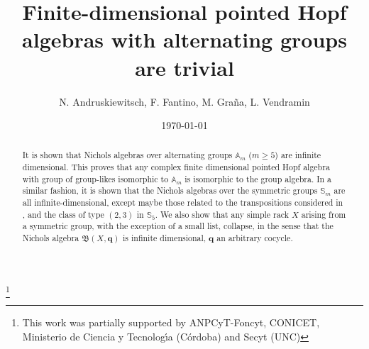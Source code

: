 \documentclass[11pt]{amsart} \textheight 22cm
\renewcommand{\^}[1]{\mbox{$^{\left( #1 \right)}$}}
\renewcommand{\_}[1]{\mbox{$_{\left( #1 \right)}$}}
\newcommand\toba{{\mathfrak B }}
\newcommand{\q}{{\mathbf q}}
\theoremstyle{plain}
\theoremstyle{definition}
\theoremstyle{remark}
\newcommand\sco{\mathbb S_5}
\newcommand\am{\mathbb A_m}
\newcommand\sm{\mathbb S_m}
\theoremstyle{remark}
\begin{document}
\renewcommand{\baselinestretch}{1.2}

\thispagestyle{empty}

\title[pointed Hopf algebras over $\am$ and $\sm$]
{Finite-dimensional pointed Hopf algebras with alternating groups
are trivial}

\author[Andruskiewitsch, Fantino, Gra\~na, Vendramin]{N. Andruskiewitsch,
F. Fantino, M. Gra\~na, L. Vendramin}

\thanks{This work was partially supported by ANPCyT-Foncyt, CONICET, Ministerio de Ciencia y
Tecnolog\'{\i}a (C\'ordoba)  and Secyt (UNC)}

\address{\noindent N. A., F. F. : Facultad de Matem\'atica, Astronom\'{\i}a y F\'{\i}sica,
Universidad Nacional de C\'ordoba. CIEM -- CONICET. %
Medina Allende s/n (5000) Ciudad Universitaria, C\'ordoba,
Argentina}
\address{\noindent M. G., L. V. : Departamento de Matem\'atica -- FCEyN,
Universidad de Buenos Aires, Pab. I -- Ciudad Universitaria (1428)
Buenos Aires -- Argentina}
\address{\noindent L. V. : Instituto de Ciencias, Universidad de Gral. Sarmiento, J.M. Gutierrez
1150, Los Polvorines (1653), Buenos Aires -- Argentina  }

\address{}

 


\date{\today}

\begin{abstract}
It is  shown that Nichols algebras over alternating groups $\am$
($m\ge 5$) are infinite dimensional.  This proves that any complex
finite dimensional pointed Hopf algebra with group of group-likes
isomorphic to $\am$ is isomorphic to the group algebra.  In a
similar fashion, it is shown that the Nichols algebras over the
symmetric groups $\sm$ are all infinite-dimensional, except maybe
those related to the transpositions considered in \cite{FK}, and
the class of type $(2,3)$ in $\sco$. We also show that any simple
rack $X$ arising from a symmetric group, with the exception of a
small list, collapse, in the sense that the Nichols algebra
$\toba(X, \q)$ is infinite dimensional, $\q$ an arbitrary cocycle.
\end{abstract}
\maketitle
\end{document}
